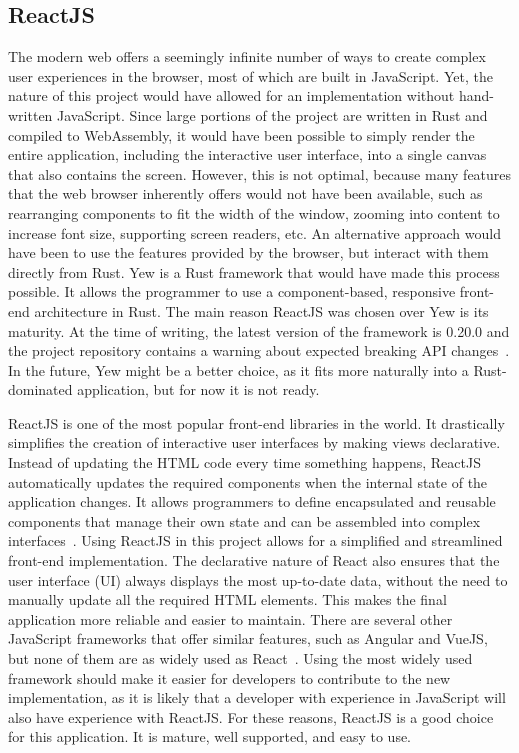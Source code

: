 \subsection{ReactJS} \label{react-js}
The modern web offers a seemingly infinite number of ways to create complex user experiences in the browser, most of which are built in JavaScript.
Yet, the nature of this project would have allowed for an implementation without hand-written JavaScript.
Since large portions of the project are written in Rust and compiled to WebAssembly, it would have been possible to simply render the entire application, including the interactive user interface, into a single canvas that also contains the screen.
However, this is not optimal, because many features that the web browser inherently offers would not have been available, such as rearranging components to fit the width of the window, zooming into content to increase font size, supporting screen readers, etc.
An alternative approach would have been to use the features provided by the browser, but interact with them directly from Rust.
Yew is a Rust framework that would have made this process possible. It allows the programmer to use a component-based, responsive front-end architecture in Rust.
The main reason ReactJS was chosen over Yew is its maturity. At the time of writing, the latest version of the framework is 0.20.0 and the project repository contains a warning about expected breaking API changes~\cite{yewweb}.
In the future, Yew might be a better choice, as it fits more naturally into a Rust-dominated application, but for now it is not ready.

ReactJS is one of the most popular front-end libraries in the world. It drastically simplifies the creation of interactive user interfaces by making views declarative.
Instead of updating the HTML code every time something happens, ReactJS automatically updates the required components when the internal state of the application changes.
It allows programmers to define encapsulated and reusable components that manage their own state and can be assembled into complex interfaces~\cite{reactweb}.
Using ReactJS in this project allows for a simplified and streamlined front-end implementation.
The declarative nature of React also ensures that the user interface (UI) always displays the most up-to-date data, without the need to manually update all the required HTML elements. This makes the final application more reliable and easier to maintain.
There are several other JavaScript frameworks that offer similar features, such as Angular and VueJS, but none of them are as widely used as React~\cite{webframework}.
Using the most widely used framework should make it easier for developers to contribute to the new implementation, as it is likely that a developer with experience in JavaScript will also have experience with ReactJS.
For these reasons, ReactJS is a good choice for this application. It is mature, well supported, and easy to use.

